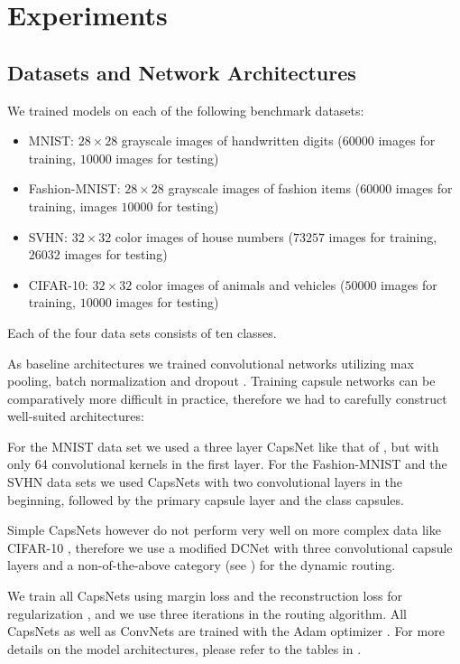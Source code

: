 
\section{Experiments}
\label{sec:experiments}

\subsection{Datasets and Network Architectures}

We trained models on each of the following benchmark datasets:
\begin{itemize}
	\item MNIST: $28\times28$ grayscale images of handwritten digits ($60000$  images for training, $10000$  images for testing) \cite{mnist}
	\item Fashion-MNIST:  $28\times28$ grayscale images of fashion items ($60000$ images for training, images $10000$ for testing) \cite{fashion}
	\item SVHN: $32\times32$ color images of house numbers ($73257$  images for training, $26032$ images for testing) \cite{svhn}
	\item CIFAR-10: $32\times32$ color images of animals and vehicles ($50000$  images for training, $10000$  images for testing) \cite{cifar}
\end{itemize}
Each of the four data sets consists of ten classes.

As baseline architectures we trained convolutional networks utilizing max pooling, batch normalization \citep{batchnorm} and dropout \citep{dropout}.
Training capsule networks can be comparatively more difficult in practice, therefore we had to carefully construct well-suited architectures:

For the MNIST data set we used a three layer CapsNet like that of \citet{capsules}, but with only 64 convolutional kernels in the first layer.
For the Fashion-MNIST and the SVHN data sets we used CapsNets with two convolutional layers in the beginning, followed by the primary capsule layer and the class capsules.

Simple CapsNets however do not perform very well on more complex data like \mbox{CIFAR-10} \citep{complex}, therefore we use a modified DCNet \citep{dcnet} with three convolutional capsule layers and a non-of-the-above category (see ) for the dynamic routing.

We train all CapsNets using margin loss and the reconstruction loss for regularization \citep{capsules}, and we use three iterations in the routing algorithm.
All CapsNets as well as ConvNets are trained with the Adam optimizer \citep{adam}.
For more details on the model architectures, please refer to the tables in .

